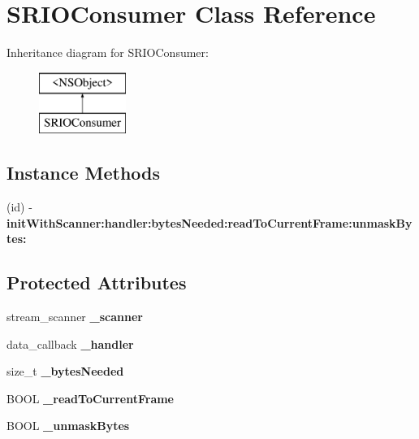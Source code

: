 \hypertarget{interface_s_r_i_o_consumer}{\section{S\-R\-I\-O\-Consumer Class Reference}
\label{interface_s_r_i_o_consumer}
}
Inheritance diagram for S\-R\-I\-O\-Consumer\-:\begin{figure}[H]
\begin{center}
\leavevmode
\includegraphics[height=2.000000cm]{interface_s_r_i_o_consumer}
\end{center}
\end{figure}
\subsection*{Instance Methods}
\begin{DoxyCompactItemize}
\item 
\hypertarget{interface_s_r_i_o_consumer_a6607db000860596a00b6d78349b9c0c9}{(id) -\/ {\bfseries init\-With\-Scanner\-:handler\-:bytes\-Needed\-:read\-To\-Current\-Frame\-:unmask\-Bytes\-:}}\label{interface_s_r_i_o_consumer_a6607db000860596a00b6d78349b9c0c9}

\end{DoxyCompactItemize}
\subsection*{Protected Attributes}
\begin{DoxyCompactItemize}
\item 
\hypertarget{interface_s_r_i_o_consumer_a89cb35781b4ee7d57669f46e0e2cbbd8}{stream\-\_\-scanner {\bfseries \-\_\-scanner}}\label{interface_s_r_i_o_consumer_a89cb35781b4ee7d57669f46e0e2cbbd8}

\item 
\hypertarget{interface_s_r_i_o_consumer_aa8620425ba6dae1bbed82ac29d91a965}{data\-\_\-callback {\bfseries \-\_\-handler}}\label{interface_s_r_i_o_consumer_aa8620425ba6dae1bbed82ac29d91a965}

\item 
\hypertarget{interface_s_r_i_o_consumer_a8980364b911f59711d6d3a59a39a0e47}{size\-\_\-t {\bfseries \-\_\-bytes\-Needed}}\label{interface_s_r_i_o_consumer_a8980364b911f59711d6d3a59a39a0e47}

\item 
\hypertarget{interface_s_r_i_o_consumer_ac45d0848f3e54759f89fd4a38eabb39e}{B\-O\-O\-L {\bfseries \-\_\-read\-To\-Current\-Frame}}\label{interface_s_r_i_o_consumer_ac45d0848f3e54759f89fd4a38eabb39e}

\item 
\hypertarget{interface_s_r_i_o_consumer_aabb61574a4f217c943ca469f87be497c}{B\-O\-O\-L {\bfseries \-\_\-unmask\-Bytes}}\label{interface_s_r_i_o_consumer_aabb61574a4f217c943ca469f87be497c}

\end{DoxyCompactItemize}
